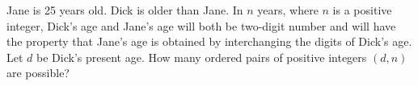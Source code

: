 Jane is 25 years old.  Dick is older than Jane.  In $n$ years, where $n$ is a positive integer, Dick's age and Jane's age will both be two-digit number and will have the property that Jane's age is obtained by interchanging the digits of Dick's age.  Let $d$ be Dick's present age.  How many ordered pairs of positive integers $(d,n)$ are possible?